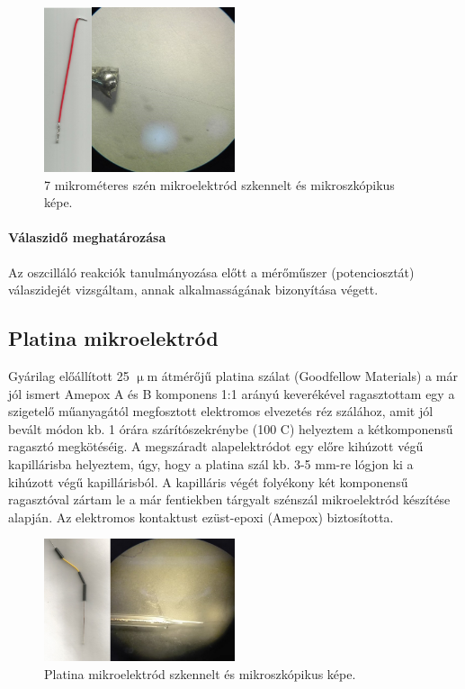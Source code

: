 \begin{figure}[h]
\centering
\includegraphics[width=0.5\textwidth]{img/szenmikro.png}
\caption{7 mikrométeres szén mikroelektród szkennelt és mikroszkópikus képe.}
\label{fig:ionophores}
\end{figure}

\paragraph{Válaszidő meghatározása}
Az oszcilláló reakciók tanulmányozása előtt a mérőműszer (potenciosztát) válaszidejét vizsgáltam, annak alkalmasságának bizonyítása végett.
\subsection{Platina mikroelektród}
Gyárilag előállított 25 $\upmu$m átmérőjű platina szálat (Goodfellow Materials) a már jól ismert Amepox A és B komponens 1:1 arányú keverékével ragasztottam egy a szigetelő műanyagától megfosztott elektromos elvezetés réz szálához, amit jól bevált módon kb. 1 órára szárítószekrénybe (100 \textdegree C) helyeztem a kétkomponensű ragasztó megkötéséig.  A megszáradt alapelektródot egy előre kihúzott végű kapillárisba helyeztem, úgy, hogy a platina szál kb. 3-5 mm-re lógjon ki a kihúzott végű kapillárisból. A kapilláris végét folyékony két komponensű ragasztóval zártam le a már fentiekben tárgyalt szénszál mikroelektród készítése alapján. Az elektromos kontaktust ezüst-epoxi (Amepox) biztosította.
\begin{figure}[h]
\centering
\includegraphics[width=0.5\textwidth]{img/platina.png}
\caption{Platina mikroelektród szkennelt és mikroszkópikus képe.}
\label{fig:ionophores}
\end{figure}
